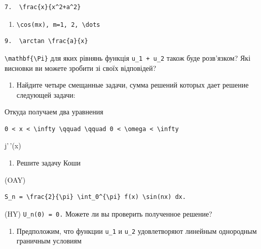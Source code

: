 \documentclass[
  ukrainian,
]{article}
\providecommand{\tightlist}{%
  \setlength{\itemsep}{0pt}\setlength{\parskip}{0pt}}
\begin{document}
\begin{verbatim}
7.  \frac{x}{x^2+a^2} 
\end{verbatim}

\begin{enumerate}
\def\labelenumi{\arabic{enumi}.}
\setcounter{enumi}{4}
\tightlist
\item
  \texttt{\textbackslash{}cos(mx),\ m=1,\ 2,\ \textbackslash{}dots}
\end{enumerate}

\begin{verbatim}
9.  \arctan \frac{a}{x} 
\end{verbatim}

\texttt{\textbackslash{}mathbf\{\textbackslash{}Pi\}} для яких рівнянь
функція \texttt{u\_1\ +\ u\_2} також буде розв'язком? Які висновки ви
можете зробити зі своїх відповідей?

\begin{enumerate}
\def\labelenumi{\arabic{enumi}.}
\setcounter{enumi}{3}
\tightlist
\item
  Найдите четыре смещанные задачи, сумма решений которых дает решение
  следующей задачи:
\end{enumerate}

Откуда получаем два уравнения

\begin{verbatim}
0 < x < \infty \qquad \qquad 0 < \omega < \infty
\end{verbatim}

j'\,'(x)

\begin{enumerate}
\def\labelenumi{\arabic{enumi}.}
\setcounter{enumi}{4}
\tightlist
\item
  Решите задачу Коши
\end{enumerate}

(OAY)

\begin{verbatim}
S_n = \frac{2}{\pi} \int_0^{\pi} f(x) \sin(nx) dx.
\end{verbatim}

(HY) \texttt{U\_n(0)\ =\ 0.} Можете ли вы проверить полученное решение?

\begin{enumerate}
\def\labelenumi{\arabic{enumi}.}
\setcounter{enumi}{5}
\tightlist
\item
  Предположим, что функции \texttt{u\_1} и \texttt{u\_2} удовлетворяют
  линейным однородным граничным условиям
\end{enumerate}
\end{document}
